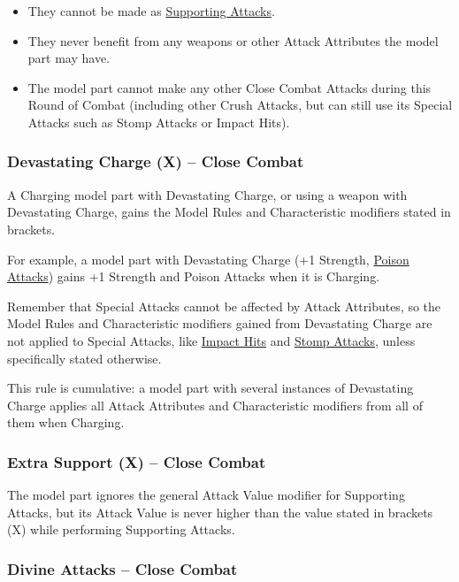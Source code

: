 \begin{itemize}
	\item They cannot be made as \hyperref[supporting_attacks]{Supporting Attacks}.
	\item They never benefit from any weapons or other Attack Attributes the model part may have.
	\item The model part cannot make any other Close Combat Attacks during this Round of Combat (including other Crush Attacks, but can still use its Special Attacks such as Stomp Attacks or Impact Hits).
\end{itemize}

\subsubsection{Devastating Charge (X) -- Close Combat}
\idx[main=y]{\devastatingcharge{}}\label{devastating_charge}

A Charging model part with Devastating Charge, or using a weapon with Devastating Charge, gains the Model Rules and Characteristic modifiers stated in brackets.

For example, a model part with Devastating Charge (+1 Strength, \hyperref[poison_attacks]{Poison Attacks}) gains +1 Strength and Poison Attacks when it is Charging.

Remember that Special Attacks cannot be affected by Attack Attributes, so the Model Rules and Characteristic modifiers gained from Devastating Charge are not applied to Special Attacks, like \hyperref[impact_hits]{Impact Hits} and \hyperref[stomp_attacks]{Stomp Attacks}, unless specifically stated otherwise.

This rule is cumulative: a model part with several instances of Devastating Charge applies all Attack Attributes and Characteristic modifiers from all of them when Charging.

\subsubsection{Extra Support (X) -- Close Combat}
\idx[main=y]{\extrasupport{}}\label{extra_support}

The model part ignores the general Attack Value modifier for Supporting Attacks, but its Attack Value is never higher than the value stated in brackets (X) while performing Supporting Attacks.

\subsubsection{Divine Attacks -- Close Combat}
\idx[main=y]{\divineattacks}\label{divine_attacks}

